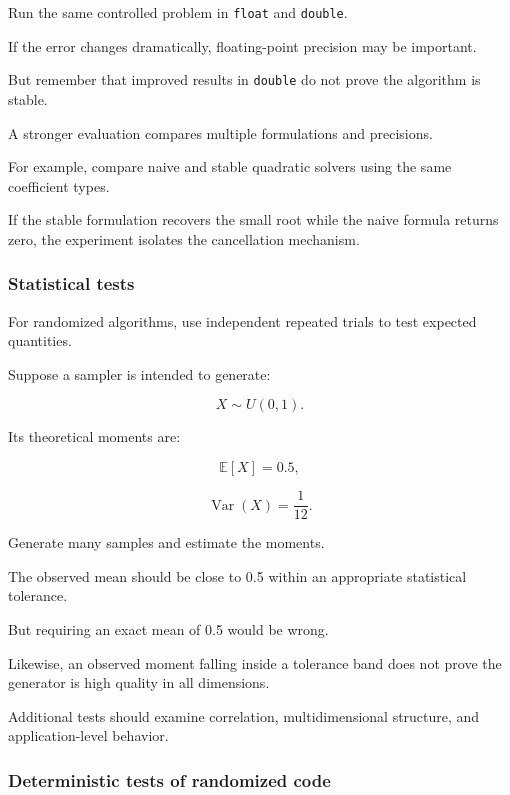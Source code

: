 \hypertarget{02-foundations-ii-ch031-cross-precision-tests}{}

Run the same controlled problem in \texttt{float} and \texttt{double}.

If the error changes dramatically, floating-point precision may be important.

But remember that improved results in \texttt{double} do not prove the algorithm is stable.

A stronger evaluation compares multiple formulations and precisions.

For example, compare naive and stable quadratic solvers using the same coefficient types.

If the stable formulation recovers the small root while the naive formula returns zero, the experiment isolates the cancellation mechanism.

\subsubsection{Statistical tests}\label{02-foundations-ii-ch031-statistical-tests}

\hypertarget{02-foundations-ii-ch031-statistical-tests}{}

For randomized algorithms, use independent repeated trials to test expected quantities.

Suppose a sampler is intended to generate:

\[ X\sim U(0,1). \]

Its theoretical moments are:

\[ \mathbb E[X]=0.5, \]

\[ \operatorname{Var}(X)=\frac1{12}. \]

Generate many samples and estimate the moments.

The observed mean should be close to 0.5 within an appropriate statistical tolerance.

But requiring an exact mean of 0.5 would be wrong.

Likewise, an observed moment falling inside a tolerance band does not prove the generator is high quality in all dimensions.

Additional tests should examine correlation, multidimensional structure, and application-level behavior.

\subsubsection{Deterministic tests of randomized code}\label{02-foundations-ii-ch031-deterministic-tests-of-randomized-code}

